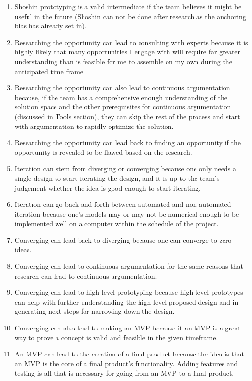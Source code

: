 \documentclass[a4paper,12pt]{article}
\begin{document}
\begin{enumerate}
	\item Shoshin prototyping is a valid intermediate if the team believes it might be useful in the future (Shoshin can not be done after research as the anchoring bias has already set in).
	\item Researching the opportunity can lead to consulting with experts because it is highly likely that many opportunities I engage with will require far greater understanding than is feasible for me to assemble on my own during the anticipated time frame.
	\item Researching the opportunity can also lead to continuous argumentation because, if the team has a comprehensive enough understanding of the solution space and the other prerequisites for continuous argumentation (discussed in Tools section), they can skip the rest of the process and start with argumentation to rapidly optimize the solution.  
	\item Researching the opportunity can lead back to finding an opportunity if the opportunity is revealed to be flawed based on the research.
	\item Iteration can stem from diverging or converging because one only needs a single design to start iterating the design, and it is up to the team’s judgement whether the idea is good enough to start iterating.
	\item Iteration can go back and forth between automated and non-automated iteration because one’s models may or may not be numerical enough to be implemented well on a computer within the schedule of the project.
	\item Converging can lead back to diverging because one can converge to zero ideas.
	\item Converging can lead to continuous argumentation for the same reasons that research can lead to continuous argumentation. 
	\item Converging can lead to high-level prototyping because high-level prototypes can help with further understanding the high-level proposed design and in generating next steps for narrowing down the design.
	\item Converging can also lead to making an MVP because it an MVP is a great way to prove a concept is valid and feasible in the given timeframe.
	\item An MVP can lead to the creation of a final product because the idea is that an MVP is the core of a final product’s functionality. Adding features and testing is all that is necessary for going from an MVP to a final product.
\end{enumerate}
\end{document}
